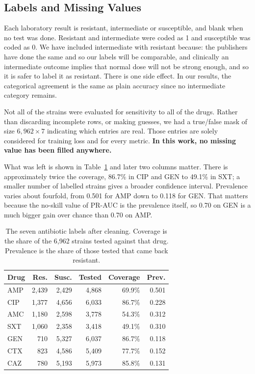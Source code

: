 \documentclass[conference]{IEEEtran}
\begin{document}
\subsection{Labels and Missing Values}

Each laboratory result is resistant, intermediate or susceptible, and blank when no
test was done. Resistant and intermediate were coded as 1 and susceptible was coded
as 0. We have included intermediate with resistant because: the publishers have done
the same and so our labels will be comparable, and clinically an intermediate outcome
implies that normal dose will not be strong enough, and so it is safer to label it as
resistant. There is one side effect. In our results, the categorical agreement is the
same as plain accuracy since no intermediate category remains.

Not all of the strains were evaluated for sensitivity to all of the drugs. Rather than
discarding incomplete rows, or making guesses, we had a true/false mask of size
$6{,}962 \times 7$ indicating which entries are real. Those entries are solely
considered for training loss and for every metric. \textbf{In this work, no missing
value has been filled anywhere.}

What was left is shown in Table~\ref{tab:labels} and later two columns matter. There
is approximately twice the coverage, 86.7\% in CIP and GEN to 49.1\% in SXT; a
smaller number of labelled strains gives a broader confidence interval. Prevalence
varies about fourfold, from 0.501 for AMP down to 0.118 for GEN. That matters because the
no-skill value of PR-AUC is the prevalence itself, so 0.70 on GEN is a much bigger
gain over chance than 0.70 on AMP.

\begin{table}[t]
\caption{The seven antibiotic labels after cleaning. Coverage is the share of the
6{,}962 strains tested against that drug. Prevalence is the share of those tested
that came back resistant.}
\label{tab:labels}
\centering
\small
\setlength{\tabcolsep}{4pt}
\renewcommand{\arraystretch}{1.15}
\begin{tabular}{|l|r|r|r|r|r|}
\hline
\rowcolor{headgrey}
\textbf{Drug} & \textbf{Res.} & \textbf{Susc.} & \textbf{Tested} & \textbf{Coverage} & \textbf{Prev.} \\ \hline
AMP & 2{,}439 & 2{,}429 & 4{,}868 & 69.9\% & 0.501 \\ \hline
CIP & 1{,}377 & 4{,}656 & 6{,}033 & 86.7\% & 0.228 \\ \hline
AMC & 1{,}180 & 2{,}598 & 3{,}778 & 54.3\% & 0.312 \\ \hline
SXT & 1{,}060 & 2{,}358 & 3{,}418 & 49.1\% & 0.310 \\ \hline
GEN & 710 & 5{,}327 & 6{,}037 & 86.7\% & 0.118 \\ \hline
CTX & 823 & 4{,}586 & 5{,}409 & 77.7\% & 0.152 \\ \hline
CAZ & 780 & 5{,}193 & 5{,}973 & 85.8\% & 0.131 \\ \hline
\end{tabular}
\renewcommand{\arraystretch}{1.0}
\end{table}
\end{document}
